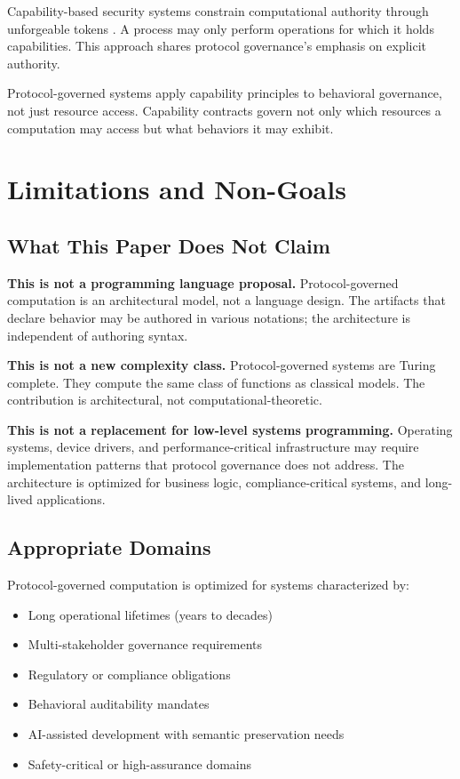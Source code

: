 \documentclass[11pt,a4paper]{article}
\begin{document}
Capability-based security systems constrain computational authority through unforgeable tokens \citep{dennis1966multiprogrammed,miller2003capability}. A process may only perform operations for which it holds capabilities. This approach shares protocol governance's emphasis on explicit authority.

Protocol-governed systems apply capability principles to behavioral governance, not just resource access. Capability contracts govern not only which resources a computation may access but what behaviors it may exhibit.



\section{Limitations and Non-Goals}
\label{sec:limitations}

\subsection{What This Paper Does Not Claim}

\textbf{This is not a programming language proposal.} Protocol-governed computation is an architectural model, not a language design. The artifacts that declare behavior may be authored in various notations; the architecture is independent of authoring syntax.

\textbf{This is not a new complexity class.} Protocol-governed systems are Turing complete. They compute the same class of functions as classical models. The contribution is architectural, not computational-theoretic.

\textbf{This is not a replacement for low-level systems programming.} Operating systems, device drivers, and performance-critical infrastructure may require implementation patterns that protocol governance does not address. The architecture is optimized for business logic, compliance-critical systems, and long-lived applications.

\subsection{Appropriate Domains}

Protocol-governed computation is optimized for systems characterized by:

\begin{itemize}[nosep]
    \item Long operational lifetimes (years to decades)
    \item Multi-stakeholder governance requirements
    \item Regulatory or compliance obligations
    \item Behavioral auditability mandates
    \item AI-assisted development with semantic preservation needs
    \item Safety-critical or high-assurance domains
\end{itemize}
\end{document}
